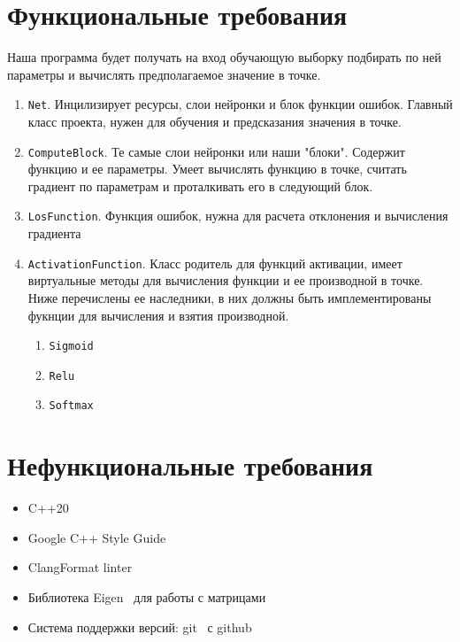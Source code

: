\documentclass{article}
\begin{document}
\section{Функциональные требования}
Наша программа будет получать на вход обучающую выборку подбирать по ней параметры и вычислять предполагаемое значение в точке.
\begin{enumerate}
\item \texttt{Net}. Инцилизирует ресурсы, слои нейронки и блок функции ошибок. Главный класс проекта, нужен для обучения и предсказания значения в точке.
\item \texttt{ComputeBlock}.  Те самые слои нейронки или наши "блоки". Содержит функцию и ее параметры. Умеет вычислять функцию в точке, считать градиент по параметрам и проталкивать его в следующий блок.
\item \texttt{LosFunction}. Функция ошибок, нужна для расчета отклонения и вычисления градиента
\item \texttt{ActivationFunction}. Класс родитель для функций активации, имеет виртуальные методы для вычисления функции и ее производной в точке. Ниже перечислены ее наследники, в них должны быть имплементированы фукнции для вычисления и взятия производной.
    \begin{enumerate}
        \item \texttt{Sigmoid}
        \item \texttt{Relu}
        \item \texttt{Softmax}
    \end{enumerate}
\end{enumerate}

\section{Нефункциональные требования}

\begin{itemize}
    \item C++20~\cite{cpp}
    \item Google C++ Style Guide~\cite{styleguide}
    \item ClangFormat linter~\cite{clangformat}
    \item Библиотека Eigen~\cite{eigen} для работы с матрицами
    \item Система поддержки версий: git~\cite{git} с github~\cite{github}
\end{itemize}

\end{document}
